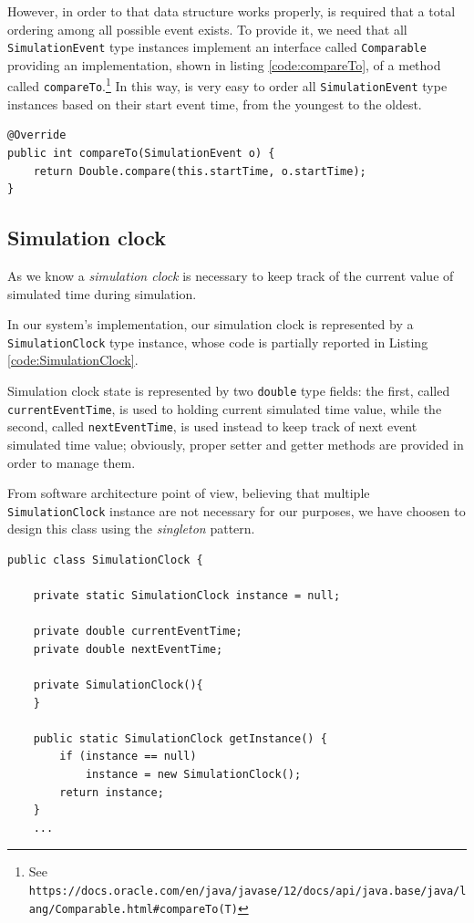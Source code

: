 \documentclass[10pt,a4paper]{article}
\begin{document}
However, in order to that data structure works properly, is required that a total ordering among all possible event exists. To provide it, we need that all \texttt{SimulationEvent} type instances implement an interface called \texttt{Comparable} providing an implementation, shown in listing \ref{code:compareTo}, of a method called \texttt{compareTo}.\footnote{See \texttt{https://docs.oracle.com/en/java/javase/12/docs/api/java.base/java/lang/Comparable.html\#compareTo(T)}} In this way, is very easy to order all \texttt{SimulationEvent} type instances based on their start event time, from the youngest to the oldest. 

\begin{lstlisting}[frame=lines, caption={Snippet of \texttt{SimulationEvent} class implementation}, label={code:compareTo}]
@Override
public int compareTo(SimulationEvent o) {
	return Double.compare(this.startTime, o.startTime);
}
\end{lstlisting}

\subsection{Simulation clock}

As we know a \textit{simulation clock} is necessary to keep track of the current value of simulated time during simulation. 

In our system's implementation, our simulation clock is represented by a \texttt{SimulationClock} type instance, whose code is partially reported in Listing \ref{code:SimulationClock}. 

Simulation clock state is represented by two \texttt{double} type fields: the first, called \texttt{currentEventTime}, is used to holding current simulated time value, while the second, called \texttt{nextEventTime}, is used instead to keep track of next event simulated time value; obviously, proper setter and getter methods are provided in order to manage them.

From software architecture point of view, believing that multiple \texttt{Simulation\-Clock} instance are not necessary for our purposes, we have choosen to design this class using the \textit{singleton} pattern. 

\begin{lstlisting}[frame=lines, caption={\texttt{SimulationClock} class implementation.}, label={code:SimulationClock}]
public class SimulationClock {

    private static SimulationClock instance = null;

    private double currentEventTime;
    private double nextEventTime;

    private SimulationClock(){
    }

    public static SimulationClock getInstance() {
        if (instance == null)
            instance = new SimulationClock();
        return instance;
    } 
    ...
\end{lstlisting}
\end{document}
